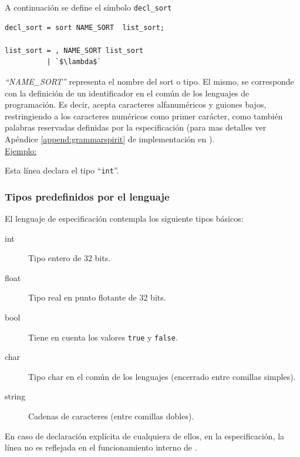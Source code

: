 A continuación se define el símbolo \texttt{decl\_sort}

\begin{lstlisting}[frame=shadowbox, rulesepcolor=\color{azul}, language=specmag, linewidth=10cm]
decl_sort = sort NAME_SORT  list_sort;

list_sort = , NAME_SORT list_sort
          | `$\lambda$`
\end{lstlisting}
\vspace{0.3cm}

\textit{``NAME\_SORT''} representa el nombre del sort o tipo. El mismo, se corresponde con la definición de un identificador en el común de los lenguajes de programación. Es decir, acepta caracteres alfanuméricos y guiones bajos, restringiendo a los caracteres numéricos como primer carácter, como también palabras reservadas definidas por la especificación (para mas detalles ver Apéndice \ref{append:grammarspirit} de implementación en \spirit).\\

\underline{Ejemplo:} \begin{center}  \end{center}
\vspace{0.2cm}
Esta línea declara el tipo ``\texttt{int}''.

\subsubsection*{Tipos predefinidos por el lenguaje}
\label{sec:typepredefined}

El lenguaje de especificación contempla los siguiente tipos básicos:

\begin{description}
\item [int] Tipo entero de 32 bits.

\item [float] Tipo real en punto flotante de 32 bits.

\item [bool] Tiene en cuenta los valores \texttt{true} y \texttt{false}.

\item [char] Tipo char en el común de los lenguajes (encerrado entre comillas simples).

\item [string] Cadenas de caracteres (entre comillas dobles).
\end{description}

En caso de declaración explícita de cualquiera de ellos, en la especificación, la línea no es reflejada en el funcionamiento interno de \maggen.

